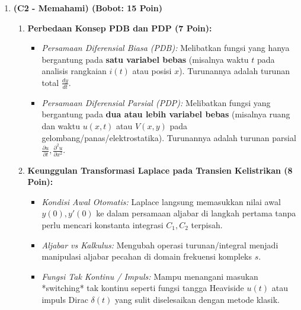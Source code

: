 \documentclass[11pt,a4paper]{article}
\begin{document}
\begin{enumerate}[label=\textbf{Soal \arabic*.}]
    \item \textbf{(C2 - Memahami) (Bobot: 15 Poin)}
    \begin{tcolorbox}[colback=green!5!white,colframe=green!60!black,title=Solusi Model:]
    \begin{enumerate}[label=(\alph*)]
        \item \textbf{Perbedaan Konsep PDB dan PDP (7 Poin):}
        \begin{itemize}
            \item \textit{Persamaan Diferensial Biasa (PDB):} Melibatkan fungsi yang hanya bergantung pada \textbf{satu variabel bebas} (misalnya waktu $t$ pada analisis rangkaian $i(t)$ atau posisi $x$). Turunannya adalah turunan total $\frac{dy}{dt}$.
            \item \textit{Persamaan Diferensial Parsial (PDP):} Melibatkan fungsi yang bergantung pada \textbf{dua atau lebih variabel bebas} (misalnya ruang dan waktu $u(x,t)$ atau $V(x,y)$ pada gelombang/panas/elektrostatika). Turunannya adalah turunan parsial $\frac{\partial u}{\partial t}, \frac{\partial^2 u}{\partial x^2}$.
        \end{itemize}
        \item \textbf{Keunggulan Transformasi Laplace pada Transien Kelistrikan (8 Poin):}
        \begin{itemize}
            \item \textit{Kondisi Awal Otomatis:} Laplace langsung memasukkan nilai awal $y(0), y'(0)$ ke dalam persamaan aljabar di langkah pertama tanpa perlu mencari konstanta integrasi $C_1, C_2$ terpisah.
            \item \textit{Aljabar vs Kalkulus:} Mengubah operasi turunan/integral menjadi manipulasi aljabar pecahan di domain frekuensi kompleks $s$.
            \item \textit{Fungsi Tak Kontinu / Impuls:} Mampu menangani masukan *switching* tak kontinu seperti fungsi tangga Heaviside $u(t)$ atau impuls Dirac $\delta(t)$ yang sulit diselesaikan dengan metode klasik.
        \end{itemize}
    \end{enumerate}
    \end{tcolorbox}


\end{enumerate}
\end{document}
